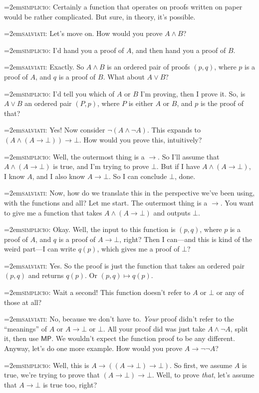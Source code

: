 \documentclass[11pt,paper=letter]{scrartcl}
\renewcommand{\sf}{\mathsf}
\renewcommand{\land}{\wedge}
\renewcommand{\lor}{\vee}
\renewcommand{\lnot}{\neg}
\newcommand{\false}{\bot}
\newcommand{\simp}{\vspace{0.5em}\noindent\hangindent=2em\textsc{simplicio:} }
\newcommand{\salv}{\vspace{0.5em}\noindent\hangindent=2em\textsc{salviati:} }
\begin{document}
\simp Certainly a function that operates on proofs written on paper would be rather complicated. But sure, in theory, it's possible.

\salv Let's move on. How would you prove $A \land B$?

\simp I'd hand you a proof of $A$, and then hand you a proof of $B$.

\salv Exactly. So $A \land B$ is an ordered pair of proofs $(p, q)$, where $p$ is a proof of $A$, and $q$ is a proof of $B$. What about $A \lor B$?

\simp I'd tell you which of $A$ or $B$ I'm proving, then I prove it. So, is $A \lor B$ an ordered pair $(P, p)$, where $P$ is either $A$ or $B$, and $p$ is the proof of that?

\salv Yes! Now consider $\lnot (A \land \lnot A)$. This expands to $(A \land (A \to \false)) \to \false$. How would you prove this, intuitively?

\simp Well, the outermost thing is a $\to$. So I'll assume that $A \land (A \to \false)$ is true, and I'm trying to prove $\false$. But if I have $A \land (A \to \false)$, I know $A$, and I also know $A \to \false$. So I can conclude $\false$, done.

\salv Now, how do we translate this in the perspective we've been using, with the functions and all? Let me start. The outermost thing is a $\to$. You want to give me a function that takes $A \land (A \to \false)$ and outputs $\false$.

\simp Okay. Well, the input to this function is $(p, q)$, where $p$ is a proof of $A$, and $q$ is a proof of $A \to \false$, right? Then I can---and this is kind of the weird part---I can write $q(p)$, which gives me a proof of $\false$?

\salv Yes. So the proof is just the function that takes an ordered pair $(p, q)$ and returns $q(p)$. Or $(p, q) \mapsto q(p)$.

\simp Wait a second! This function doesn't refer to $A$ or $\false$ or any of those at all?

\salv No, because we don't have to. \emph{Your} proof didn't refer to the ``meanings'' of $A$ or $A \to \false$ or $\false$. All your proof did was just take $A \land \lnot A$, split it, then use $\sf{MP}$. We wouldn't expect the function proof to be any different. Anyway, let's do one more example. How would you prove $A \to \lnot\lnot A$?

\simp Well, this is $A \to ((A \to \false) \to \false)$. So first, we assume $A$ is true, we're trying to prove that $(A \to \false) \to \false$. Well, to prove \emph{that}, let's assume that $A \to \false$ is true too, right?
\end{document}
